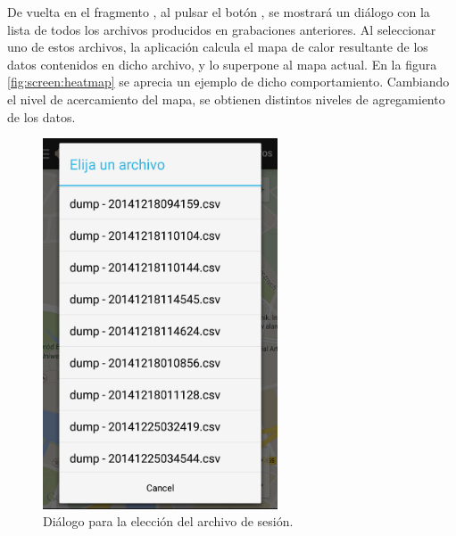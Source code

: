 \begin{figure}[H]
\begin{minipage}{0.45\textwidth}
\end{minipage}
\end{figure}

    De vuelta en el fragmento , al pulsar el botón , se mostrará un diálogo con la lista de todos los archivos producidos en grabaciones anteriores. Al seleccionar uno de estos archivos, la aplicación calcula el mapa de calor resultante de los datos contenidos en dicho archivo, y lo superpone al mapa actual. En la figura \ref{fig:screen:heatmap} se aprecia un ejemplo de dicho comportamiento. Cambiando el nivel de acercamiento del mapa, se obtienen distintos niveles de agregamiento de los datos.
    
\begin{figure}[H] \centering%
 \begin{minipage}{0.45\textwidth}\centering%
    \includegraphics[height=11cm]{graphs/filepicker.png} \caption{Diálogo para la elección del archivo de sesión.}\label{fig:screen:filepicker}%
 \end{minipage}
 \hfill
\begin{minipage}{0.45\textwidth}\centering%

\end{minipage}
\end{figure}

